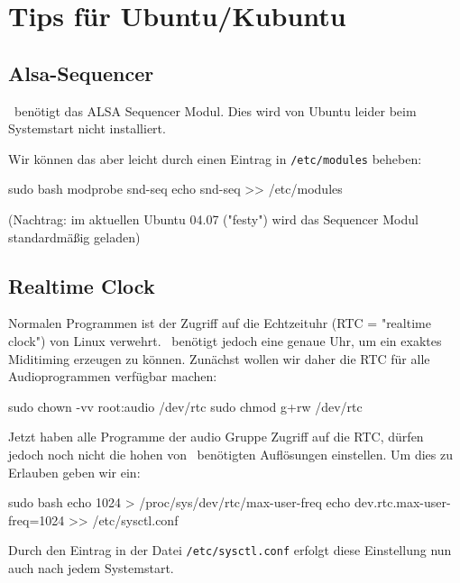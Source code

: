   \section{Tips für Ubuntu/Kubuntu}

    \subsection{Alsa-Sequencer}

      \M\ benötigt das ALSA Sequencer Modul. Dies wird von Ubuntu leider
      beim Systemstart nicht installiert.

      Wir können das aber leicht durch einen Eintrag in {\tt /etc/modules}
      beheben:

      \starttyping
            sudo bash
            modprobe snd-seq
            echo snd-seq >> /etc/modules
      \stoptyping

      (Nachtrag: im aktuellen Ubuntu 04.07 ("festy") wird das Sequencer
      Modul standardmäßig geladen)

    \subsection{Realtime Clock}

      Normalen Programmen ist der Zugriff auf die Echtzeituhr
      (RTC = "realtime clock") von Linux
      verwehrt. \M\ benötigt jedoch eine genaue Uhr, um ein exaktes
      Miditiming erzeugen zu können.
      Zunächst wollen wir daher die RTC für alle Audioprogrammen
      verfügbar machen:

      \starttyping
            sudo chown -vv root:audio /dev/rtc
            sudo chmod g+rw /dev/rtc
      \stoptyping

      Jetzt haben alle Programme der audio Gruppe Zugriff auf die
      RTC, dürfen jedoch noch nicht die hohen von \M\ benötigten
      Auflösungen einstellen.
      Um dies zu Erlauben geben wir ein:

      \starttyping
            sudo bash
            echo 1024 > /proc/sys/dev/rtc/max-user-freq
            echo dev.rtc.max-user-freq=1024 >> /etc/sysctl.conf
      \stoptyping

      Durch den Eintrag in der Datei {\tt /etc/sysctl.conf} erfolgt diese
      Einstellung nun auch nach jedem Systemstart.


